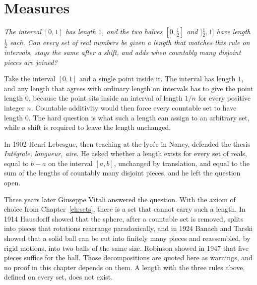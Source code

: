 \chapter{Measures}\label{ch:measures}

\begin{center}\itshape
The interval $[0,1]$ has length $1$, and the two halves $[0,\tfrac12]$ and $]\tfrac12,1]$ have length $\tfrac12$ each.
Can every set of real numbers be given a length that matches this rule on intervals, stays the same after a shift, and adds when countably many disjoint pieces are joined?
\end{center}

Take the interval $[0,1]$ and a single point inside it. The interval has length $1$, and any length that agrees with ordinary length on intervals has to give the point length $0$, because the point sits inside an interval of length $1/n$ for every positive integer $n$.
Countable additivity would then force every countable set to have length $0$.
The hard question is what such a length can assign to an arbitrary set, while a shift is required to leave the length unchanged.

In 1902 Henri Lebesgue, then teaching at the lyc\'ee in Nancy, defended the thesis \emph{Int\'egrale, longueur, aire}.
He asked whether a length exists for every set of reals, equal to $b-a$ on the interval $[a,b]$, unchanged by translation, and equal to the sum of the lengths of countably many disjoint pieces, and he left the question open.


Three years later Giuseppe Vitali answered the question.
With the axiom of choice from Chapter~\ref{ch:sets}, there is a set that cannot carry such a length.
In 1914 Hausdorff showed that the sphere, after a countable set is removed, splits into pieces that rotations rearrange paradoxically, and in 1924 Banach and Tarski showed that a solid ball can be cut into finitely many pieces and reassembled, by rigid motions, into two balls of the same size.
Robinson showed in 1947 that five pieces suffice for the ball.
Those decompositions are quoted here as warnings, and no proof in this chapter depends on them.
A length with the three rules above, defined on every set, does not exist.


